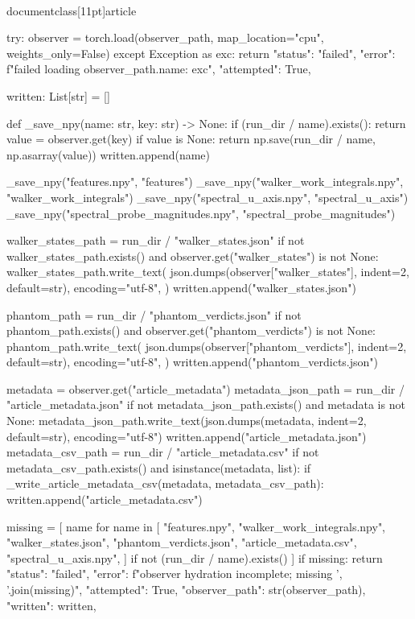 \\documentclass[11pt]{article}
\begin{document}
\begin{CodeBlock}
    try:
        observer = torch.load(observer_path, map_location="cpu", weights_only=False)
    except Exception as exc:
        return {
            "status": "failed",
            "error": f"failed loading {observer_path.name}: {exc}",
            "attempted": True,
        }

    written: List[str] = []

    def _save_npy(name: str, key: str) -> None:
        if (run_dir / name).exists():
            return
        value = observer.get(key)
        if value is None:
            return
        np.save(run_dir / name, np.asarray(value))
        written.append(name)

    _save_npy("features.npy", "features")
    _save_npy("walker_work_integrals.npy", "walker_work_integrals")
    _save_npy("spectral_u_axis.npy", "spectral_u_axis")
    _save_npy("spectral_probe_magnitudes.npy", "spectral_probe_magnitudes")

    walker_states_path = run_dir / "walker_states.json"
    if not walker_states_path.exists() and observer.get("walker_states") is not None:
        walker_states_path.write_text(
            json.dumps(observer["walker_states"], indent=2, default=str),
            encoding="utf-8",
        )
        written.append("walker_states.json")

    phantom_path = run_dir / "phantom_verdicts.json"
    if not phantom_path.exists() and observer.get("phantom_verdicts") is not None:
        phantom_path.write_text(
            json.dumps(observer["phantom_verdicts"], indent=2, default=str),
            encoding="utf-8",
        )
        written.append("phantom_verdicts.json")

    metadata = observer.get("article_metadata")
    metadata_json_path = run_dir / "article_metadata.json"
    if not metadata_json_path.exists() and metadata is not None:
        metadata_json_path.write_text(json.dumps(metadata, indent=2, default=str), encoding="utf-8")
        written.append("article_metadata.json")
    metadata_csv_path = run_dir / "article_metadata.csv"
    if not metadata_csv_path.exists() and isinstance(metadata, list):
        if _write_article_metadata_csv(metadata, metadata_csv_path):
            written.append("article_metadata.csv")

    missing = [
        name for name in [
            "features.npy",
            "walker_work_integrals.npy",
            "walker_states.json",
            "phantom_verdicts.json",
            "article_metadata.csv",
            "spectral_u_axis.npy",
        ]
        if not (run_dir / name).exists()
    ]
    if missing:
        return {
            "status": "failed",
            "error": f"observer hydration incomplete; missing {', '.join(missing)}",
            "attempted": True,
            "observer_path": str(observer_path),
            "written": written,
        }


\end{CodeBlock}
\end{document}
